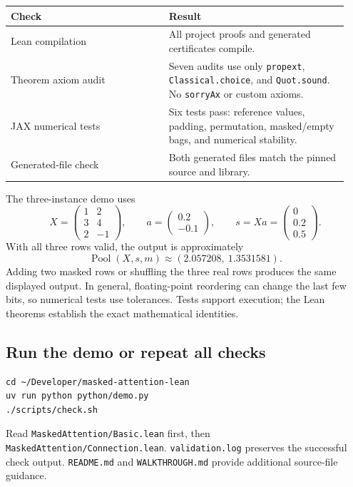 \documentclass[11pt]{article}
\newcommand{\Pool}{\operatorname{Pool}}
\newcommand{\code}[1]{\nolinkurl{#1}}
\begin{document}
\begin{center}
\begin{tabular}{@{}p{0.44\linewidth}p{0.50\linewidth}@{}}
\toprule
Check & Result\\
\midrule
Lean compilation & All project proofs and generated certificates compile.\\[5pt]
Theorem axiom audit & Seven audits use only \code{propext},
\code{Classical.choice}, and \code{Quot.sound}. No \code{sorryAx} or custom axioms.\\[5pt]
JAX numerical tests & Six tests pass: reference values, padding,
permutation, masked/empty bags, and numerical stability.\\[5pt]
Generated-file check & Both generated files match the pinned source and library.\\
\bottomrule
\end{tabular}
\end{center}
The three-instance demo uses
\[
 X=\begin{pmatrix}1&2\\3&4\\2&-1\end{pmatrix},\qquad
 a=\begin{pmatrix}0.2\\-0.1\end{pmatrix},\qquad
 s=Xa=\begin{pmatrix}0\\0.2\\0.5\end{pmatrix}.
\]
With all three rows valid, the output is approximately
\[
 \Pool(X,s,m)\approx(2.057208,\ 1.3531581).
\]
Adding two masked rows or shuffling the three real rows produces the same
displayed output. In general, floating-point reordering can change the last
few bits, so numerical tests use tolerances. Tests support execution;
the Lean theorems establish the exact mathematical identities.

\subsection*{Run the demo or repeat all checks}
\begin{lstlisting}
cd ~/Developer/masked-attention-lean
uv run python python/demo.py
./scripts/check.sh
\end{lstlisting}
Read \code{MaskedAttention/Basic.lean} first, then
\code{MaskedAttention/Connection.lean}. \code{validation.log} preserves the
successful check output. \code{README.md} and \code{WALKTHROUGH.md} provide
additional source-file guidance.
\end{document}
